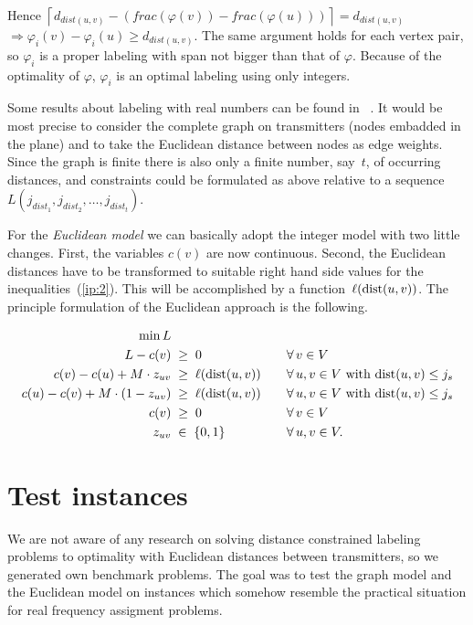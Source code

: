 \documentclass[smallextended]{svjour3}
\def\dist{\mathop{\rm dist}}
\begin{document}
Hence $\left\lceil d_{dist(u,v)}-(frac(\varphi(v))-frac(\varphi(u)))\right\rceil =d_{dist(u,v)}$ 
$\Rightarrow\varphi_{i}(v)-\varphi_{i}(u)\geq d_{dist(u,v)}$. The same argument holds for each vertex pair, so $\varphi_{i}$ is a proper labeling with span not bigger than that of $\varphi$. Because of the optimality of $\varphi$, $\varphi_{i}$ is an optimal labeling using only integers. 

Some results about labeling with real numbers can be found in ~\cite{13}. 
It would be most precise to consider the complete graph on transmitters (nodes embadded in the 
plane) and to take the Euclidean distance between nodes 
as edge weights. Since the graph is finite there is also only a finite 
number, say~$t$, of occurring distances, and constraints could be formulated as above 
relative to a sequence $L(j_{dist_{1}},j_{dist_{2}},\ldots ,j_{dist_{t}})$. 

For the \emph{Euclidean model} we can basically adopt the integer model 
with two little changes. First, the variables $c(v)$ are now continuous. 
Second, the Euclidean distances have to be transformed to suitable right hand 
side values for the inequalities~(\ref{ip:2}). This will be accomplished by a 
function~$\ell(\dist(u,v))$. The principle formulation of the Euclidean approach is the following. 

\begin{alignat}{2} 
\min L      &                            & \quad & \notag\\ 
L-c(v)       &\;\ge\;0                    & \quad &\forall\, v\in V\notag\\ 
c(v)-c(u)+M\cdot z_{uv}     &\;\geq\;\ell(\dist(u,v)) & \quad& \forall\, u,v\in V\text{ with }{\dist(u,v)}\le j_s\notag\\ 
c(u)-c(v)+M\cdot(1-z_{uv}) &\;\geq\;\ell(\dist(u,v)) &   &\forall\, u,v\in V\text{ with }{\dist(u,v)}\le j_s\notag\\ 
c(v)          &\;\geq\;0                  & &\forall\, v\in V \notag\\ 
z_{uv}                                &\;\in\;\{0,1\}              &  & \forall\, u,v\in V.\notag 
\end{alignat} 

\section{Test instances} 

We are not aware of any research on solving distance constrained labeling problems 
to optimality with Euclidean distances between transmitters, so we generated own benchmark problems. The goal was to test the 
graph model and the Euclidean model on instances which somehow resemble the practical 
situation for real frequency assigment problems. 
\end{document}
